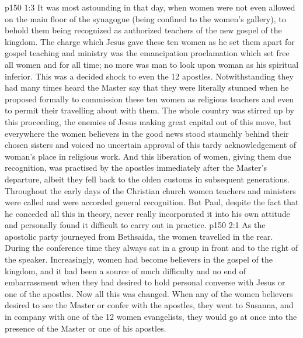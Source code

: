 \vs p150 1:3 It was most astounding in that day, when women were not even allowed on the main floor of the synagogue (being confined to the women’s gallery), to behold them being recognized as authorized teachers of the new gospel of the kingdom. The charge which Jesus gave these ten women as he set them apart for gospel teaching and ministry was the emancipation proclamation which set free all women and for all time; no more was man to look upon woman as his spiritual inferior. This was a decided shock to even the 12 apostles. Notwithstanding they had many times heard the Master say that  they were literally stunned when he proposed formally to commission these ten women as religious teachers and even to permit their travelling about with them. The whole country was stirred up by this proceeding, the enemies of Jesus making great capital out of this move, but everywhere the women believers in the good news stood staunchly behind their chosen sisters and voiced no uncertain approval of this tardy acknowledgement of woman’s place in religious work. And this liberation of women, giving them due recognition, was practised by the apostles immediately after the Master’s departure, albeit they fell back to the olden customs in subsequent generations. Throughout the early days of the Christian church women teachers and ministers were called  and were accorded general recognition. But Paul, despite the fact that he conceded all this in theory, never really incorporated it into his own attitude and personally found it difficult to carry out in practice.
\vs p150 2:1 As the apostolic party journeyed from Bethsaida, the women travelled in the rear. During the conference time they always sat in a group in front and to the right of the speaker. Increasingly, women had become believers in the gospel of the kingdom, and it had been a source of much difficulty and no end of embarrassment when they had desired to hold personal converse with Jesus or one of the apostles. Now all this was changed. When any of the women believers desired to see the Master or confer with the apostles, they went to Susanna, and in company with one of the 12 women evangelists, they would go at once into the presence of the Master or one of his apostles.
